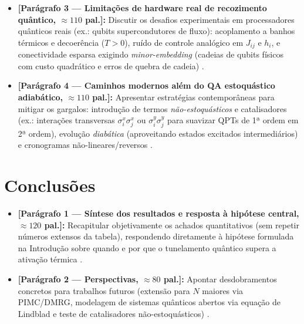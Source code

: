 \documentclass[aps,pre,twocolumn,10pt,superscriptaddress,nofootinbib]{revtex4-2}
\begin{document}
\begin{itemize}
  \item \textbf{[Parágrafo 3 --- Limitações de hardware real de recozimento quântico, $\approx 110$ pal.]:}
        Discutir os desafios experimentais em processadores quânticos reais (ex.: qubits supercondutores de fluxo): acoplamento a banhos térmicos e decoerência ($T > 0$), ruído de controle analógico em $J_{ij}$ e $h_i$, e conectividade esparsa exigindo \emph{minor-embedding} (cadeias de qubits físicos com custo quadrático e erros de quebra de cadeia) \cite{Albash2018,Chakrabarti2022}.
  \item \textbf{[Parágrafo 4 --- Caminhos modernos além do QA estoquástico adiabático, $\approx 110$ pal.]:}
        Apresentar estratégias contemporâneas para mitigar os gargalos: introdução de termos \emph{não-estoquásticos} e catalisadores (ex.: interações transversas $\sigma_i^x \sigma_j^x$ ou $\sigma_i^y \sigma_j^y$ para suavizar QPTs de 1ª ordem em 2ª ordem), evolução \emph{diabática} (aproveitando estados excitados intermediários) e cronogramas não-lineares/reversos \cite{Das2008,Albash2018,Chakrabarti2022}.
\end{itemize}

\section{Conclusões}
\label{sec:conclusoes}

\begin{itemize}
  \item \textbf{[Parágrafo 1 --- Síntese dos resultados e resposta à hipótese central, $\approx 120$ pal.]:}
        Recapitular objetivamente os achados quantitativos (sem repetir números extensos da tabela), respondendo diretamente à hipótese formulada na Introdução sobre quando e por que o tunelamento quântico supera a ativação térmica \cite{Kadowaki1998,Das2008}.
  \item \textbf{[Parágrafo 2 --- Perspectivas, $\approx 80$ pal.]:}
        Apontar desdobramentos concretos para trabalhos futuros (extensão para $N$ maiores via PIMC/DMRG, modelagem de sistemas quânticos abertos via equação de Lindblad e teste de catalisadores não-estoquásticos) \cite{Albash2018,Chakrabarti2022}.
\end{itemize}
\end{document}
